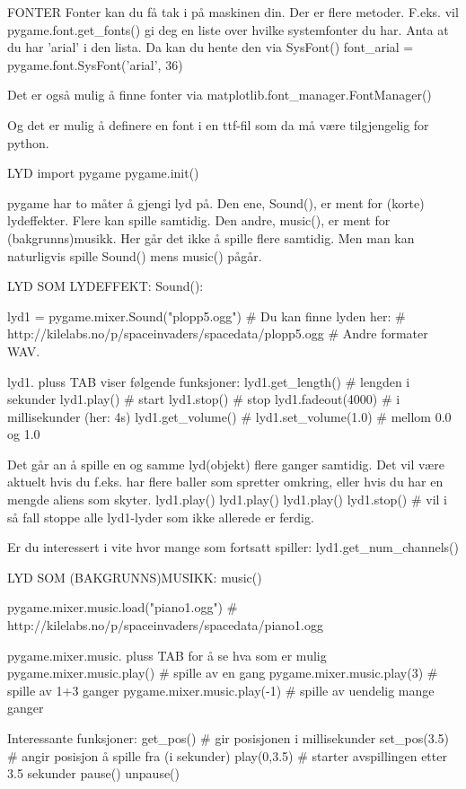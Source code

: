 FONTER
Fonter kan du få tak i på maskinen din.
Der er flere metoder.
F.eks. vil pygame.font.get_fonts()
gi deg en liste over hvilke systemfonter du har.
Anta at du har 'arial' i den lista.
Da kan du hente den via SysFont()
font_arial = pygame.font.SysFont('arial', 36)

Det er også mulig å finne fonter via 
matplotlib.font_manager.FontManager()

Og det er mulig å definere en font i en ttf-fil
som da må være tilgjengelig for python. 



LYD
import pygame
pygame.init()

pygame har to måter å gjengi lyd på.
Den ene, Sound(), er ment for (korte) lydeffekter.
Flere kan spille samtidig. 
Den andre, music(), er ment for (bakgrunns)musikk.
Her går det ikke å spille flere samtidig.
Men man kan naturligvis spille Sound() mens music() pågår.

LYD SOM LYDEFFEKT: Sound(): 

lyd1 = pygame.mixer.Sound("plopp5.ogg")
# Du kan finne lyden her:
# http://kilelabs.no/p/spaceinvaders/spacedata/plopp5.ogg
# Andre formater WAV. 

lyd1.  pluss TAB viser følgende funksjoner:
lyd1.get_length()     # lengden i sekunder
lyd1.play()           # start
lyd1.stop()           # stop
lyd1.fadeout(4000)    # i millisekunder (her: 4s)
lyd1.get_volume()     #
lyd1.set_volume(1.0)  # mellom 0.0 og 1.0

Det går an å spille en og samme lyd(objekt) flere ganger samtidig.
Det vil være aktuelt hvis du f.eks. har flere baller som spretter omkring,
eller hvis du har en mengde aliens som skyter.
lyd1.play()
lyd1.play()
lyd1.play()
lyd1.stop()   # vil i så fall stoppe alle lyd1-lyder som ikke allerede er ferdig. 

Er du interessert i vite hvor mange som fortsatt spiller: 
lyd1.get_num_channels()



LYD SOM (BAKGRUNNS)MUSIKK: music()

pygame.mixer.music.load("piano1.ogg")
# http://kilelabs.no/p/spaceinvaders/spacedata/piano1.ogg 

pygame.mixer.music.  pluss TAB for å se hva som er mulig 
pygame.mixer.music.play()    # spille av en gang
pygame.mixer.music.play(3)   # spille av 1+3 ganger
pygame.mixer.music.play(-1)  # spille av uendelig mange ganger

Interessante funksjoner:
get_pos()     # gir posisjonen i millisekunder
set_pos(3.5)  # angir posisjon å spille fra (i sekunder)
play(0,3.5)   # starter avspillingen etter 3.5 sekunder 
pause()
unpause()

